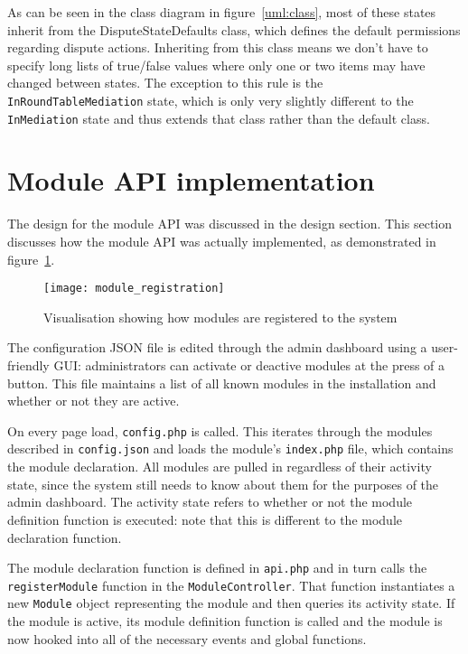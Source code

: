 As can be seen in the class diagram in figure~\ref{uml:class}, most of these states inherit from the DisputeStateDefaults class, which defines the default permissions regarding dispute actions. Inheriting from this class means we don't have to specify long lists of true/false values where only one or two items may have changed between states. The exception to this rule is the \lstinline{InRoundTableMediation} state, which is only very slightly different to the \lstinline{InMediation} state and thus extends that class rather than the default class.

\section{Module API implementation}

The design for the module API was discussed in the design section. This section discusses how the module API was actually implemented, as demonstrated in figure~\ref{uml:moduleRegistration}.

\begin{figure}[h!]
  \centering
    \ifimages
    \texttt{[image: module\_registration]}
    \fi
  \caption{Visualisation showing how modules are registered to the system}
  \label{uml:moduleRegistration}
\end{figure}

The configuration JSON file is edited through the admin dashboard using a user-friendly GUI: administrators can activate or deactive modules at the press of a button. This file maintains a list of all known modules in the installation and whether or not they are active.

On every page load, \lstinline{config.php} is called. This iterates through the modules described in \lstinline{config.json} and loads the module's \lstinline{index.php} file, which contains the module declaration. All modules are pulled in regardless of their activity state, since the system still needs to know about them for the purposes of the admin dashboard. The activity state refers to whether or not the module definition function is executed: note that this is different to the module declaration function.

The module declaration function is defined in \lstinline{api.php} and in turn calls the \lstinline{registerModule} function in the \lstinline{ModuleController}. That function instantiates a new \lstinline{Module} object representing the module and then queries its activity state. If the module is active, its module definition function is called and the module is now hooked into all of the necessary events and global functions.

